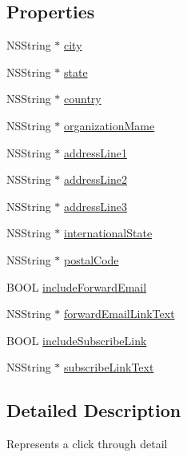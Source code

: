 \subsection*{Properties}
\begin{DoxyCompactItemize}
\item 
N\-S\-String $\ast$ \hyperlink{interface_message_footer_a6365e46e0fc2ed5982402f34c4e1c4c9}{city}
\item 
N\-S\-String $\ast$ \hyperlink{interface_message_footer_a69bc801741c248f3c12bae5e0331230d}{state}
\item 
N\-S\-String $\ast$ \hyperlink{interface_message_footer_a4def2ff0c730951ceb0aae2a05b13b07}{country}
\item 
N\-S\-String $\ast$ \hyperlink{interface_message_footer_adf13fd90f483caf3d975eac3ed1c7c41}{organization\-Mame}
\item 
N\-S\-String $\ast$ \hyperlink{interface_message_footer_a8278f88f64bb96316ee4ae1abc46f5bf}{address\-Line1}
\item 
N\-S\-String $\ast$ \hyperlink{interface_message_footer_aa5644230f6a1bf32831317fdd8be78e9}{address\-Line2}
\item 
N\-S\-String $\ast$ \hyperlink{interface_message_footer_a5a1d7e6fea3836f35ffcf6a087528259}{address\-Line3}
\item 
N\-S\-String $\ast$ \hyperlink{interface_message_footer_ae49fb626cf7ca43f273acddd77fd9eca}{international\-State}
\item 
N\-S\-String $\ast$ \hyperlink{interface_message_footer_a42135ae605d6179303926df09fdb4788}{postal\-Code}
\item 
B\-O\-O\-L \hyperlink{interface_message_footer_acd61c32deaf55e5fc7327dbaf95ec8f5}{include\-Forward\-Email}
\item 
N\-S\-String $\ast$ \hyperlink{interface_message_footer_a7301fdaaf574173a94ef9c63582cad1e}{forward\-Email\-Link\-Text}
\item 
B\-O\-O\-L \hyperlink{interface_message_footer_a06c7c5c3813cda7d746804ff0f79a877}{include\-Subscribe\-Link}
\item 
N\-S\-String $\ast$ \hyperlink{interface_message_footer_a58b5723e3312f652174f4cf8d8c32d4b}{subscribe\-Link\-Text}
\end{DoxyCompactItemize}


\subsection{Detailed Description}
Represents a click through detail 

